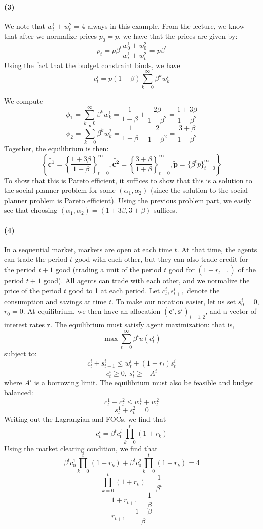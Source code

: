 \documentclass[10pt,letter]{article}
\renewcommand{\vector}[1]{\boldsymbol{#1}}
\newcommand{\problempart}[1]{\paragraph{#1}}
\begin{document}
\problempart{(3)}
We note that $w^1_t + w^2_t = 4$ always in this example. From the lecture, we know that after we normalize prices $p_0 = p$, we have that the prices are given by:
\[ p_t = p\beta^t \frac{w^1_0 + w^2_0}{w^1_t + w^2_t} = p\beta^t \]
Using the fact that the budget constraint binds, we have
\[ c^i_t = p(1-\beta)\sum_{k=0}^\infty \beta^k w^i_k \]

We compute
\[ \phi_1 = \sum_{k=0}^\infty \beta^k w^1_k = \frac{1}{1-\beta} + \frac{2\beta }{1-\beta^2} = \frac{1 + 3\beta }{1-\beta^2} \]
\[ \phi_2 = \sum_{k=0}^\infty \beta^k w^2_k = \frac{1}{1-\beta} + \frac{2}{1-\beta^2} = \frac{3 + \beta }{1-\beta^2} \]
Together, the equilibrium is then:
\[ \left\{\vector{\tilde{c^1}} = \left\{\frac{1+3\beta }{1+\beta} \right\}_{t=0}^\infty, \vector{\tilde{c^2}} = \left\{\frac{3+\beta }{1+\beta} \right\}_{t=0}^\infty, \vector{\tilde{p}} =\{ \beta^t p \}_{t=0}^\infty \right\} \]
To show that this is Pareto efficient, it suffices to show that this is a solution to the social planner problem for some $(\alpha_1, \alpha_2)$ (since the solution to the social planner problem is Pareto efficient). Using the previous problem part, we easily see that choosing $(\alpha_1, \alpha_2) = (1+3\beta, 3+\beta)$ suffices.
\problempart{(4)}
In a sequential market, markets are open at each time $t$. At that time, the agents can trade the period $t$ good with each other, but they can also trade credit for the period $t+1$ good (trading a unit of the period $t$ good for $(1+r_{t+1})$ of the period $t+1$ good). All agents can trade with each other, and we normalize the price of the period $t$ good to 1 at each period. Let $c^i_t, s^i_{t+1}$ denote the consumption and savings at time $t$. To make our notation easier, let us set $s^i_0 = 0$, $r_0 = 0$. At equilibrium, we then have an allocation $(\vector{c}^i, \vector{s}^i)_{i=1,2}$, and a vector of interest rates $\vector{r}$. The equilibrium must satisfy agent maximization: that is,
\[ \max \sum_{t=0}^\infty \beta^t u(c^i_t) \]
subject to:
\[ c^i_t + s^i_{t+1} \le w^i_t + (1+r_{t})s^i_t \]
\[ c^i_t \ge 0, \ s^i_t \ge -A^i \]
where $A^i$ is a borrowing limit. The equilibrium must also be feasible and budget balanced:
\[ c^1_t + c^2_t \le w^1_t + w^2_t \]
\[ s^1_t + s^2_t = 0 \]
Writing out the Lagrangian and FOCs, we find that
\[ c^i_t = \beta^t c^i_0 \prod_{k=0}^t (1+ r_k)  \]
Using the market clearing condition, we find that
\[\beta^t c^1_0 \prod_{k=0}^t (1+ r_k) + \beta^t c^2_0 \prod_{k=0}^t (1+ r_k) = 4 \]
\[ \prod_{k=0}^t (1+ r_k) = \frac{1}{\beta^t} \]
\[ 1 + r_{t+1} = \frac{1}{\beta} \]
\[ r_{t+1} = \frac{1-\beta}{\beta} \]
\end{document}
